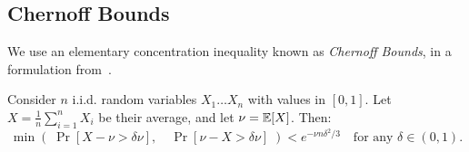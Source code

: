 \subsection{Chernoff Bounds}

We use an elementary concentration inequality known as {\em Chernoff Bounds}, in a formulation from~\cite{MitzUpfal-book05}.
\begin{theorem}
\label{thm:chernoff}
Consider $n$ i.i.d. random variables $X_1 \ldots X_n$ with values in $[0,1]$. Let
    $X = \tfrac{1}{n} \sum_{i=1}^n X_i$ be their average, and let $\nu = \E[X]$. Then:
\[ \min\left(\; \Pr[ X-\nu > \delta \nu ],\quad
                \Pr[ \nu-X > \delta \nu ]
    \; \right)
    < e^{-\nu n \delta^2/3}
    \quad \text{for any $\delta\in (0,1)$.}
\]
\end{theorem}




%
%
%



